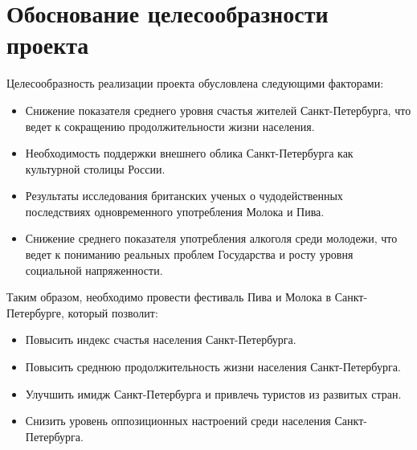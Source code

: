 \documentclass[a4paper,12pt]{article}
\begin{document}
\section{Обоснование целесообразности проекта}
Целесообразность реализации проекта обусловлена следующими факторами:
\begin{itemize}
  \item Снижение показателя среднего уровня счастья жителей Санкт-Петербурга, что ведет к сокращению продолжительности жизни населения.
  \item Необходимость поддержки внешнего облика Санкт-Петербурга как культурной столицы России.
  \item Результаты исследования британских ученых о чудодейственных последствиях  одновременного употребления Молока и Пива.
  \item Снижение среднего показателя употребления алкоголя среди молодежи, что ведет к пониманию реальных проблем Государства и росту уровня социальной напряженности.
\end{itemize}
Таким образом, необходимо провести фестиваль Пива и Молока в Санкт-Петербурге, который позволит:
\begin{itemize}
  \item Повысить индекс счастья населения Санкт-Петербурга.
  \item Повысить среднюю продолжительность жизни населения Санкт-Петербурга.
  \item Улучшить имидж Санкт-Петербурга и привлечь туристов из развитых стран.
  \item Снизить уровень оппозиционных настроений среди населения Санкт-Петербурга.
\end{itemize}
\end{document}
